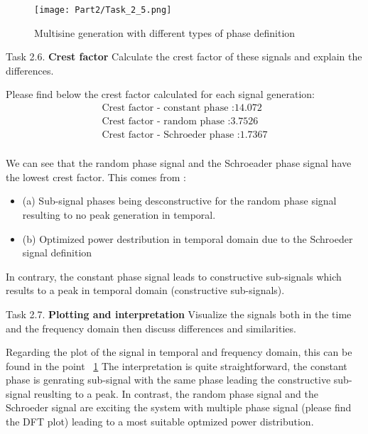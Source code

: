 \begin{figure}[H]
    \centering
    \texttt{[image: Part2/Task\_2\_5.png]}
    \caption{Multisine generation with different types of phase definition}
    \label{Multisine generation}
\end{figure}

\begin{Task}{Task 2.6.}
    \textbf{Crest factor} Calculate the crest factor of these signals and explain
the differences.
\end{Task}

Please find below the crest factor calculated for each signal generation:
\begin{align*}
    \text{Crest factor - constant phase :} 14.072 \\
    \text{Crest factor - random phase :} 3.7526 \\
    \text{Crest factor - Schroeder phase :} 1.7367 \\
\end{align*}

We can see that the random phase signal and the Schroeader phase signal have the lowest crest factor.  This comes from :
\begin{itemize}
    \item (a) Sub-signal phases being desconstructive for the random phase signal resulting to no peak generation in temporal.
    \item (b) Optimized power destribution in temporal domain due to the Schroeder signal definition
\end{itemize}

In contrary, the constant phase signal leads to constructive sub-signals which results to a peak in temporal domain (constructive sub-signals).

\begin{Task}{Task 2.7.}
    \textbf{Plotting and interpretation} Visualize the signals both in the time
    and the frequency domain then discuss differences and similarities.
\end{Task}

Regarding the plot of the signal in temporal and frequency domain, this can be found in the point ~\ref{Multisine generation} 
The interpretation is quite straightforward, the constant phase is genrating sub-signal with the same phase leading the constructive sub-signal reuslting to a peak.
In contrast, the random phase signal and the Schroeder signal are exciting the system with multiple phase signal (please find the DFT plot) leading to a most suitable optmized power distribution.

